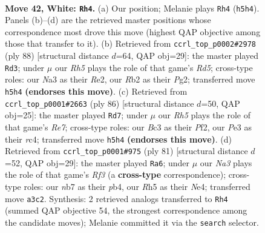 \documentclass[11pt]{article}
\begin{document}
\clearpage

\begin{figure}[p]\centering
\begin{subfigure}{0.46\textwidth}\centering
\resizebox{\linewidth}{!}{%
\newchessgame
\chessboard[
  setfen={1rr5/pn3p2/1p2p1kp/7R/2P5/N1B1P3/PR3PP1/5K2 w - - 1 42},
  showmover=false,
  pgfstyle=straightmove, color=movearrow, markmove={h5-h4}
]}
\caption{}
\end{subfigure}\hfill
\begin{subfigure}{0.46\textwidth}\centering
\resizebox{\linewidth}{!}{%
\newchessgame
\chessboard[
  setfen={8/p4k2/1p1prp2/2rR4/4PB1p/b4P2/P3R1PK/8 w - - 1 45},
  showmover=false,
  pgfstyle=straightmove, color=movearrow, markmove={d5-d3}
]}
\caption{}
\end{subfigure}
\\[4pt]
\begin{subfigure}{0.46\textwidth}\centering
\resizebox{\linewidth}{!}{%
\newchessgame
\chessboard[
  setfen={5rk1/4Rp2/7p/3p2pP/p1rP4/5RP1/P4PK1/8 w - - 2 44},
  showmover=false,
  pgfstyle=straightmove, color=movearrow, markmove={e7-d7}
]}
\caption{}
\end{subfigure}\hfill
\begin{subfigure}{0.46\textwidth}\centering
\resizebox{\linewidth}{!}{%
\newchessgame
\chessboard[
  setfen={1k6/1p4p1/5r2/p2r1p2/PP1Pn2p/3K3P/4N1P1/1R3R2 b - - 0 41},
  showmover=false,
  pgfstyle=straightmove, color=movearrow, markmove={f6-a6}
]}
\caption{}
\end{subfigure}
\caption{\textbf{Move 42, White: \texttt{Rh4}.} (a) Our position; Melanie plays \texttt{Rh4} (\texttt{h5h4}). Panels (b)--(d) are the retrieved master positions whose correspondence most drove this move (highest QAP objective among those that transfer to it). (b) Retrieved from \texttt{ccrl\_top\_p0002\#2978} (ply 88) [structural distance $d$=64, QAP obj=29]: the master played \texttt{Rd3}; under $\mu$ our \emph{Rh5} plays the role of that game's \emph{Rd5}; cross-type roles: our \emph{N}a3 as their \emph{R}e2, our \emph{R}b2 as their \emph{P}g2; transferred move \texttt{h5h4} \textbf{(endorses this move)}. (c) Retrieved from \texttt{ccrl\_top\_p0001\#2663} (ply 86) [structural distance $d$=50, QAP obj=25]: the master played \texttt{Rd7}; under $\mu$ our \emph{Rh5} plays the role of that game's \emph{Re7}; cross-type roles: our \emph{B}c3 as their \emph{P}f2, our \emph{P}e3 as their \emph{r}c4; transferred move \texttt{h5h4} \textbf{(endorses this move)}. (d) Retrieved from \texttt{ccrl\_top\_p0001\#975} (ply 81) [structural distance $d$=52, QAP obj=29]: the master played \texttt{Ra6}; under $\mu$ our \emph{Na3} plays the role of that game's \emph{Rf3} (a \textbf{cross-type} correspondence); cross-type roles: our \emph{n}b7 as their \emph{p}b4, our \emph{R}h5 as their \emph{N}e4; transferred move \texttt{a3c2}. Synthesis: 2 retrieved analogs transferred to \texttt{Rh4} (summed QAP objective 54, the strongest correspondence among the candidate moves); Melanie committed it via the \texttt{search} selector.}
\label{fig:thought-m82}
\end{figure}
\end{document}
